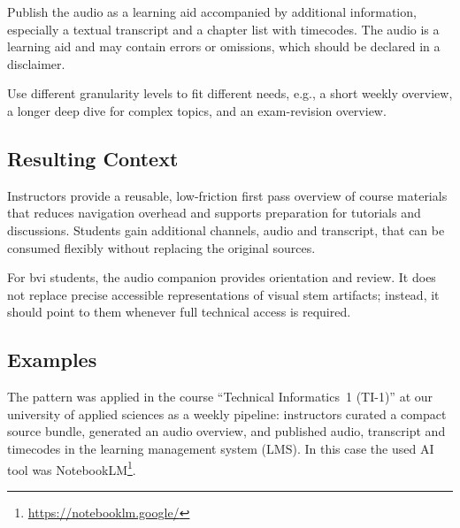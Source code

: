 Publish the audio as a learning aid accompanied by additional information, especially a textual transcript and a chapter list with timecodes.
The audio is a learning aid and may contain errors or omissions, which should be declared in a disclaimer.

Use different granularity levels to fit different needs, e.g., a short weekly overview, a longer deep dive for complex topics, and an exam-revision overview.

\subsection*{Resulting Context}

Instructors provide a reusable, low-friction first pass overview of course materials that reduces navigation overhead and supports preparation for tutorials and discussions. Students gain additional channels, audio and transcript, that can be consumed flexibly without replacing the original sources.

For \ac{bvi} students, the audio companion provides orientation and review. It does not replace precise accessible representations of visual \ac{stem} artifacts; instead, it should point to them whenever full technical access is required.

\subsection*{Examples}

The pattern was applied in the course ``Technical Informatics~1 (TI-1)'' at our university of applied sciences as a weekly pipeline: instructors curated a compact source bundle, generated an audio overview, and published audio, transcript and timecodes in the learning management system (LMS). In this case the used AI tool was NotebookLM\footnote{\url{https://notebooklm.google/}}. 

